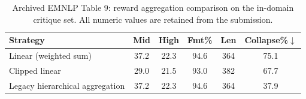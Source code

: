 \begin{table}[H]
\centering
\small
\caption{Archived EMNLP Table 9: reward aggregation comparison on the in-domain critique set. All numeric values are retained from the submission.}
\label{tab:legacy_aggregation_ablation}
\setlength{\tabcolsep}{4pt}
\begin{tabular}{@{}l ccccc@{}}
\toprule
\textbf{Strategy} & \textbf{Mid} & \textbf{High} & \textbf{Fmt\%} & \textbf{Len} & \textbf{Collapse\%}$\downarrow$ \\
\midrule
Linear (weighted sum) & 37.2 & 22.3 & 94.6 & 364 & 75.1 \\
Clipped linear & 29.0 & 21.5 & 93.0 & 382 & 67.7 \\
\rowcolor{blue!6}
Legacy hierarchical aggregation & 37.2 & 22.3 & 94.6 & 364 & 37.9 \\
\bottomrule
\end{tabular}
\end{table}
